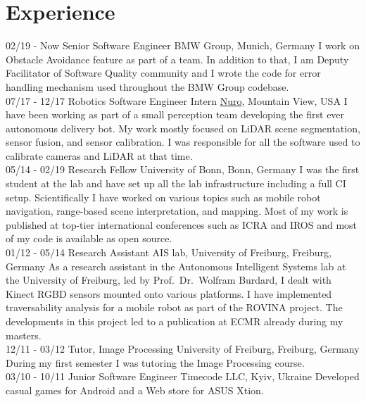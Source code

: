 \documentclass[]{friggeri-cv}
\begin{document}
\section{Experience}
\begin{entrylist}
  \entry
    {02/19 - Now}
    {Senior Software Engineer}
    {BMW Group, Munich, Germany}
    {I work on Obstacle Avoidance feature as part of a team. In addition to that, I am Deputy Facilitator of Software Quality community and I wrote the code for error handling mechanism used throughout the BMW Group codebase.\\}
  \entry
    {07/17 - 12/17}
    {Robotics Software Engineer Intern}
    {\href{https://nuro.ai/}{Nuro}, Mountain View, USA}
    {I have been working as part of a small perception team developing the first ever autonomous delivery bot. My work mostly focused on LiDAR scene segmentation, sensor fusion, and sensor calibration. I was responsible for all the software used to calibrate cameras and LiDAR at that time.\\}
  \entry
    {05/14 - 02/19}
    {Research Fellow}
    {University of Bonn, Bonn, Germany}
    {I was the first student at the lab and have set up all the lab infrastructure including a full CI setup. Scientifically I have worked on various topics such as mobile robot navigation, range-based scene interpretation, and mapping. Most of my work is published at top-tier international conferences such as ICRA and IROS and most of my code is available as open source.\\}
  \entry
    {01/12 - 05/14}
    {Research Assistant}
    {AIS lab, University of Freiburg, Freiburg, Germany}
    {As a research assistant in the Autonomous Intelligent Systems lab at the University of Freiburg, led by Prof.~Dr.~Wolfram Burdard, I dealt with Kinect RGBD sensors mounted onto various platforms. I have implemented traversability analysis for a mobile robot as part of the ROVINA project. The developments in this project led to a publication at ECMR already during my masters.\\}
  \entry
    {12/11 - 03/12}
    {Tutor, Image Processing}
    {University of Freiburg, Freiburg, Germany}
    {During my first semester I was tutoring the Image Processing course.\\}
  \entry
    {03/10 - 10/11}
    {Junior Software Engineer}
    {Timecode LLC, Kyiv, Ukraine}
    {Developed casual games for Android and a Web store for ASUS Xtion.}
\end{entrylist}
\\
\end{document}
